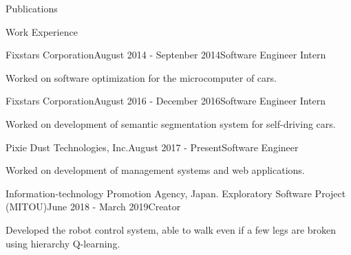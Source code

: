 \documentclass{resume} %
\begin{document}
\begin{rSection}{Publications}

\end{rSection}

\begin{rSection}{Work Experience}

    \begin{rSubsection}{Fixstars Corporation}{August 2014 - Septenber 2014}{Software Engineer Intern}{}
    \item Worked on software optimization for the microcomputer of cars.
    \end{rSubsection}

    \begin{rSubsection}{Fixstars Corporation}{August 2016 - December 2016}{Software Engineer Intern}{}
    \item Worked on development of semantic segmentation system for self-driving cars.
    \end{rSubsection}

    \begin{rSubsection}{Pixie Dust Technologies, Inc.}{August 2017 - Present}{Software Engineer}{}
    \item Worked on development of management systems and web applications.
    \end{rSubsection}

    \begin{rSubsection}{Information-technology Promotion Agency, Japan. Exploratory Software Project (MITOU)}{June 2018 - March 2019}{Creator}{}
    \item Developed the robot control system, able to walk even if a few legs are broken using hierarchy Q-learning.
    \end{rSubsection}

\end{rSection}
\end{document}
